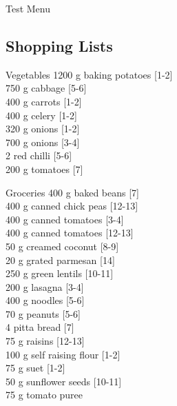 \begin{menu}{Test Menu}
    \subsection*{Shopping Lists}
      \begin{shoppinglist}{Vegetables}
      1200 g baking potatoes 
        {\scriptsize[1-2]}\\
      750 g cabbage 
        {\scriptsize[5-6]}\\
      400 g carrots 
        {\scriptsize[1-2]}\\
      400 g celery 
        {\scriptsize[1-2]}\\
      320 g onions 
        {\scriptsize[1-2]}\\
      700 g onions 
        {\scriptsize[3-4]}\\
      2  red chilli 
        {\scriptsize[5-6]}\\
      200 g tomatoes 
        {\scriptsize[7]}\\
      \end{shoppinglist}%
      \begin{shoppinglist}{Groceries}
      400 g baked beans 
        {\scriptsize[7]}\\
      400 g canned chick peas 
        {\scriptsize[12-13]}\\
      400 g canned tomatoes 
        {\scriptsize[3-4]}\\
      400 g canned tomatoes 
        {\scriptsize[12-13]}\\
      50 g creamed coconut 
        {\scriptsize[8-9]}\\
      20 g grated parmesan 
        {\scriptsize[14]}\\
      250 g green lentils 
        {\scriptsize[10-11]}\\
      200 g lasagna 
        {\scriptsize[3-4]}\\
      400 g noodles 
        {\scriptsize[5-6]}\\
      70 g peanuts 
        {\scriptsize[5-6]}\\
      4  pitta bread 
        {\scriptsize[7]}\\
      75 g raisins 
        {\scriptsize[12-13]}\\
      100 g self raising flour 
        {\scriptsize[1-2]}\\
      75 g suet 
        {\scriptsize[1-2]}\\
      50 g sunflower seeds 
        {\scriptsize[10-11]}\\
      75 g tomato puree 

\end{shoppinglist}
\end{menu}
